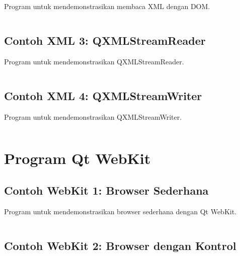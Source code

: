 Program untuk mendemonstrasikan membaca XML dengan DOM.

\begin{lstlisting}[language=c++, caption=Membaca XML dengan DOM]

\end{lstlisting}

\subsection{Contoh XML 3: QXMLStreamReader}

Program untuk mendemonstrasikan QXMLStreamReader.

\begin{lstlisting}[language=c++, caption=QXMLStreamReader]

\end{lstlisting}

\subsection{Contoh XML 4: QXMLStreamWriter}

Program untuk mendemonstrasikan QXMLStreamWriter.

\begin{lstlisting}[language=c++, caption=QXMLStreamWriter]

\end{lstlisting}

\section{Program Qt WebKit}

\subsection{Contoh WebKit 1: Browser Sederhana}

Program untuk mendemonstrasikan browser sederhana dengan Qt WebKit.

\begin{lstlisting}[language=c++, caption=Browser Sederhana]

\end{lstlisting}

\subsection{Contoh WebKit 2: Browser dengan Kontrol}

